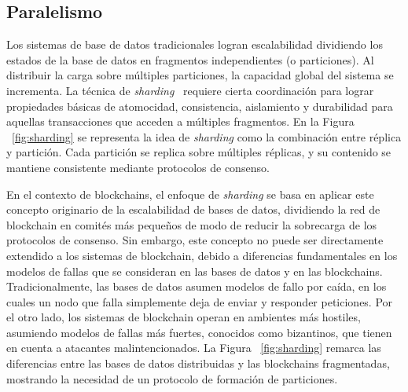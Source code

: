 

\subsection{Paralelismo}
Los sistemas de base de datos tradicionales logran escalabilidad dividiendo
los estados de la base de datos en fragmentos independientes (o particiones).
%
Al distribuir la carga sobre múltiples particiones, la capacidad global del sistema
se incrementa.
%
La técnica de \emph{sharding}~\cite{Dang2019Sharding} requiere cierta coordinación para lograr propiedades
básicas de atomocidad, consistencia, aislamiento y durabilidad para aquellas transacciones
que acceden a múltiples fragmentos.
%
En la Figura ~\ref{fig:sharding} se representa la idea de \emph{sharding} como la combinación entre
réplica y partición.
%
Cada partición se replica sobre múltiples réplicas, y su contenido se mantiene consistente
mediante protocolos de consenso.

En el contexto de blockchains, el enfoque de \emph{sharding} se basa en aplicar este concepto
originario de la escalabilidad de bases de datos, dividiendo la red de blockchain en comités más
pequeños de modo de reducir la sobrecarga de los protocolos de consenso.
%
Sin embargo, este concepto no puede ser directamente extendido a los sistemas de blockchain, debido
a diferencias fundamentales en los modelos de fallas que se consideran en las bases de datos
y en las blockchains.
%
Tradicionalmente, las bases de datos asumen modelos de fallo por caída, en los cuales un nodo que falla
simplemente deja de enviar y responder peticiones.
%
Por el otro lado, los sistemas de blockchain operan en ambientes más hostiles, asumiendo modelos de fallas
más fuertes, conocidos como bizantinos, que tienen en cuenta a atacantes malintencionados.
%
La Figura ~\ref{fig:sharding} remarca las diferencias entre las bases de datos distribuidas y las blockchains fragmentadas,
mostrando la necesidad de un protocolo de formación de particiones.

